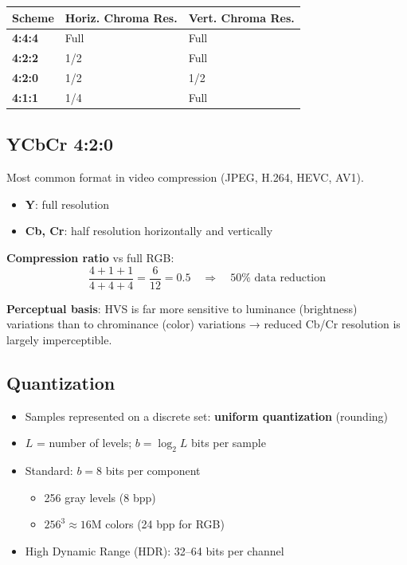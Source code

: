 \begin{center}
\begin{tabular}{|l|l|l|}
\hline
\textbf{Scheme} & \textbf{Horiz. Chroma Res.} & \textbf{Vert. Chroma Res.} \\ \hline
\textbf{4:4:4} & Full & Full \\ \hline
\textbf{4:2:2} & 1/2 & Full \\ \hline
\textbf{4:2:0} & 1/2 & 1/2 \\ \hline
\textbf{4:1:1} & 1/4 & Full \\ \hline
\end{tabular}
\end{center}

\subsection{YCbCr 4:2:0}

Most common format in video compression (JPEG, H.264, HEVC, AV1).

\begin{itemize}
\item \textbf{Y}: full resolution
\item \textbf{Cb, Cr}: half resolution horizontally and vertically
\end{itemize}

\textbf{Compression ratio} vs full RGB:
\[
\frac{4+1+1}{4+4+4} = \frac{6}{12} = 0.5 \quad \Rightarrow \quad 50\% \text{ data reduction}
\]

\textbf{Perceptual basis}: HVS is far more sensitive to luminance (brightness) variations than to chrominance (color) variations → reduced Cb/Cr resolution is largely imperceptible.

\subsection{Quantization}

\begin{itemize}
\item Samples represented on a discrete set: \textbf{uniform quantization} (rounding)
\item $L$ = number of levels; $b = \log_2 L$ bits per sample
\item Standard: $b = 8$ bits per component
\begin{itemize}
\item 256 gray levels (8 bpp)
\item $256^3 \approx 16\text{M}$ colors (24 bpp for RGB)
\end{itemize}
\item High Dynamic Range (HDR): 32–64 bits per channel
\end{itemize}

